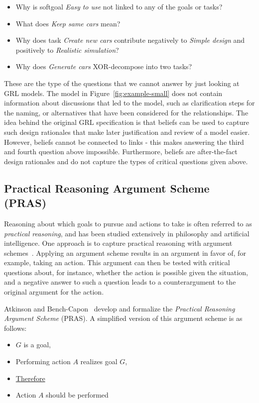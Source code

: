 \begin{itemize}
	\item Why is softgoal \emph{Easy to use} not linked to any of the goals or tasks? 
	\item What does \emph{Keep same cars} mean?
	\item Why does task \emph{Create new cars} contribute negatively to \emph{Simple design} and positively to \emph{Realistic simulation}?
	\item Why does \emph{Generate cars} XOR-decompose into two tasks?
\end{itemize}

These are the type of the questions that we cannot answer by just looking at GRL models. The model in Figure~\ref{fig:example-small} does not contain information about discussions that led to the model, such as clarification steps for the naming, or alternatives that have been considered for the relationships. The idea behind the original GRL specification is that beliefs can be used to capture such design rationales that make later justification and review of a model easier. However, beliefs cannot be connected to links - this makes answering the third and fourth question above impossible. Furthermore, beliefs are after-the-fact design rationales and do not capture the types of critical questions given above. 

\subsection{Practical Reasoning Argument Scheme (PRAS)}
\label{sect:background:pras}

Reasoning about which goals to pursue and actions to take is often referred to as \emph{practical reasoning}, and has been studied extensively in philosophy and artificial intelligence. One approach is to capture practical reasoning with argument schemes~\cite{walton1990}. Applying an argument scheme results in an argument in favor of, for example, taking an action. This argument can then be tested with critical questions about, for instance, whether the action is possible given the situation, and a negative answer to such a question leads to a counterargument to the original argument for the action. 

Atkinson and Bench-Capon~\cite{atkinson2007} develop and formalize the \emph{Practical Reasoning Argument Scheme} (PRAS). A simplified version of this argument scheme is as follows:

\begin{itemize}
\item[] $G$ is a goal,
\item[] Performing action $A$ realizes goal $G$,
\item[] \underline{Therefore} 
\item[] Action $A$ should be performed
\end{itemize}

